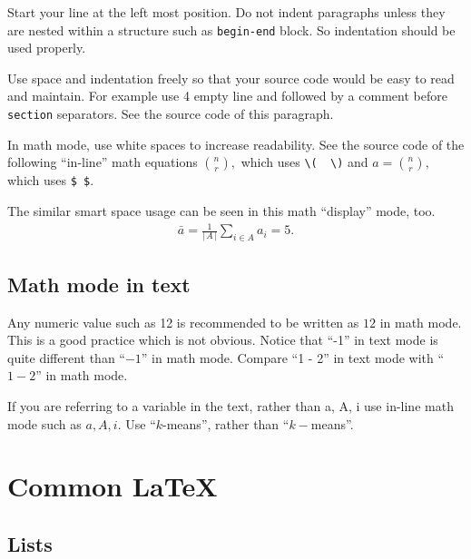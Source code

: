 \documentclass[10pt,journal,compsoc]{IEEEtran}
\newcommand{\hCode}[1]{\texttt{{\footnotesize #1}}}
\newcommand{\hAbs}[1]{\ensuremath{\left \lvert \, #1 \, \right \rvert} } %
\theoremstyle{plain}
\theoremstyle{definition}
\theoremstyle{remark}
\begin{document}
Start your line at the left most position.
Do not indent paragraphs unless they are nested within a structure such as \hCode{begin-end} block.
So indentation should be used properly.

Use space and indentation freely so that your source code would be easy to read and maintain.
For example use 4 empty line and followed by a comment before \hCode{section} separators.
See the source code of this paragraph.

In math mode, 
use white spaces to increase readability.
See the source code of the following ``in-line'' math equations
\(
	\binom{n}{r},
\)
which uses \verb!\(  \)!
and
$
	a = {n \choose r},
$
which uses \verb!$ $!.

The similar smart space usage can be seen in this math ``display'' mode, too.
\begin{align}
	\bar{a} 
		= 
			\frac
				{1}
				{\hAbs{A}}
			\sum_{i \in A} 
				a_{i}
		= 5.
\end{align}




\subsection{Math mode in text}

Any numeric value such as 12 is recommended to be written as $12$ in math mode.
This is a good practice which is not obvious.
Notice that ``-1'' in text mode is quite different than ``$-1$'' in math mode.
Compare ``1 - 2'' in text mode with ``$1 - 2$'' in math mode.

If you are referring to a variable in the text,
rather than a, A, i
use in-line math mode such as $a, A, i$.
Use ``$k$-means'', rather than ``$k-$means''.




\section{Common \LaTeX}




\subsection{Lists}




\end{document}
